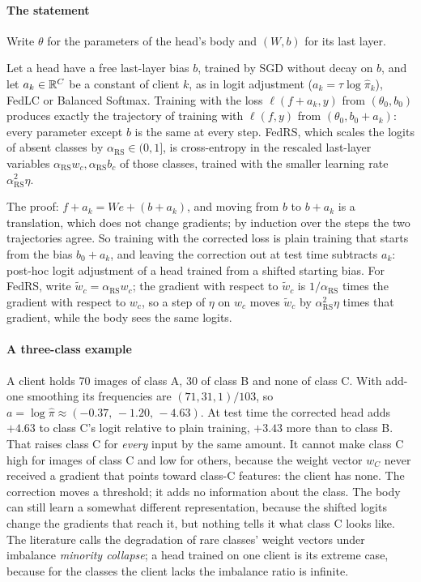 \paragraph{The statement} Write $\theta$ for the parameters of the head's body and $(W,b)$ for its last layer.

\begin{lemma*}
Let a head have a free last-layer bias $b$, trained by SGD without decay on $b$, and let $a_k\in\mathbb{R}^C$ be a constant
of client $k$, as in logit adjustment ($a_k=\tau\log\hat\pi_k$), FedLC or Balanced Softmax. Training with the loss
$\ell(f+a_k,y)$ from $(\theta_0,b_0)$ produces exactly the trajectory of training with $\ell(f,y)$ from
$(\theta_0,b_0+a_k)$: every parameter except $b$ is the same at every step. FedRS, which scales the logits of absent
classes by $\alpha_{\mathrm{RS}}\in(0,1]$, is cross-entropy in the rescaled last-layer variables $\alpha_{\mathrm{RS}} w_c,\alpha_{\mathrm{RS}} b_c$ of those
classes, trained with the smaller learning rate $\alpha_{\mathrm{RS}}^2\eta$.
\end{lemma*}

The proof: $f+a_k=We+(b+a_k)$, and moving from $b$ to $b+a_k$ is a translation, which does not change gradients; by
induction over the steps the two trajectories agree. So training with the corrected loss is plain training that
starts from the bias $b_0+a_k$, and leaving the correction out at test time subtracts $a_k$: post-hoc logit adjustment
of a head trained from a shifted starting bias. For FedRS, write $\tilde w_c=\alpha_{\mathrm{RS}} w_c$; the gradient with respect to
$\tilde w_c$ is $1/\alpha_{\mathrm{RS}}$ times the gradient with respect to $w_c$, so a step of $\eta$ on $w_c$ moves $\tilde w_c$ by
$\alpha_{\mathrm{RS}}^2\eta$ times that gradient, while the body sees the same logits.

\paragraph{A three-class example} A client holds 70 images of class A, 30 of class B and none of class C. With add-one
smoothing its frequencies are $(71,31,1)/103$, so $a=\log\hat\pi\approx(-0.37,\,-1.20,\,-4.63)$. At test time the
corrected head adds $+4.63$ to class C's logit relative to plain training, $+3.43$ more than to class B. That raises
class C for \emph{every} input by the same amount. It cannot make class C high for images of class C and low for others,
because the weight vector $w_C$ never received a gradient that points toward class-C features: the client has none.
The correction moves a threshold; it adds no information about the class. The body can still learn a somewhat
different representation, because the shifted logits change the gradients that reach it, but nothing tells it what
class C looks like. The literature calls the degradation of rare classes' weight vectors under imbalance
\emph{minority collapse}; a head trained on one client is its extreme case, because for the classes the client lacks
the imbalance ratio is infinite.

